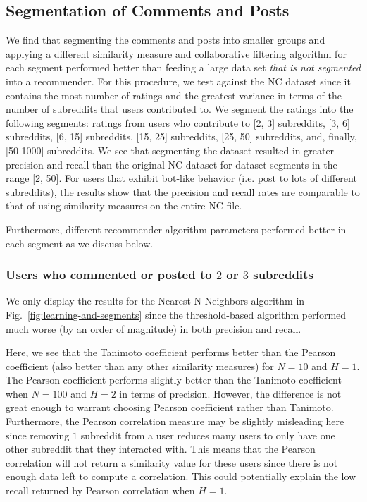 \documentclass{article}
\begin{document}
\subsection{Segmentation of Comments and Posts}\label{sec:set-com-posts}

We find that segmenting the comments and posts into smaller groups and applying a different similarity measure
and collaborative filtering algorithm for each segment performed better than  feeding a large data set \emph{that is not segmented} into a recommender. For this procedure, 
we test against the NC dataset since it contains the most number of ratings and the greatest variance
in terms of the number of subreddits that users contributed to. We segment the ratings into the following segments: 
ratings from users who contribute to [2, 3] subreddits, [3, 6] subreddits, [6, 15] subreddits, [15, 25] subreddits, [25, 50] 
subreddits, and, finally, [50-1000] subreddits. We see that segmenting the dataset
resulted in greater precision and recall than the original NC dataset for dataset segments in the
range [2, 50]. For users that exhibit bot-like behavior (i.e. post to lots of different
subreddits), the results show that the precision and recall rates are comparable
to that of using similarity measures on the entire NC file. 

Furthermore, different recommender algorithm parameters performed better in each segment as we discuss below. 

\subsubsection{Users who commented or posted to $2$ or $3$ subreddits}\label{2-3-users}

We only display the results for the Nearest N-Neighbors algorithm in Fig.~\ref{fig:learning-and-segments}
since the threshold-based
algorithm performed much worse (by an order of magnitude) in both precision and recall.

Here, we see that the Tanimoto coefficient performs better than the Pearson coefficient (also 
better than any other similarity measures) for $N = 10$ and $H = 1$. The Pearson coefficient 
performs slightly better than the Tanimoto coefficient when $N = 100$ and $H = 2$ in terms of 
precision. However, the difference is not great enough to warrant choosing Pearson coefficient 
rather than Tanimoto. Furthermore, the Pearson correlation measure may be slightly misleading 
here since removing $1$ subreddit from a user reduces many users to only have one other 
subreddit that they interacted with. This means that the Pearson correlation will not 
return a similarity value for these users since there is not enough data left to compute a 
correlation. This could potentially explain the low recall returned by Pearson correlation
when $H = 1$.
\end{document}
